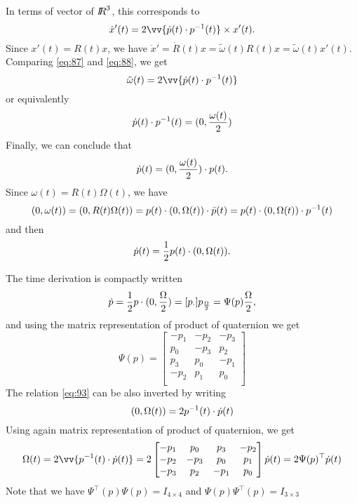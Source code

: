 In terms of vector of $\mbox{\rm $I\!\!R$}^3$, this corresponds to
\begin{equation}
  \label{eq:88}
  \dot x'(t) = 2 \vv{ \dot p(t) \glaw p^{-1}(t) } \times x'(t).
\end{equation}
Since $x'(t) = R(t) x$, we have $\dot x' = \dot R(t) x = \tilde \omega(t) R(t) x  = \tilde \omega(t) x'(t) $. Comparing \eqref{eq:87} and \eqref{eq:88}, we get
\begin{equation}
  \label{eq:89}
  \tilde \omega(t)  = 2 \vv{ \dot p(t) \glaw p^{-1}(t) } 
\end{equation}
or equivalently
\begin{equation}
  \dot p(t) \cdot p^{-1}(t) = (0, \frac{\omega(t)}{2} )
  \label{eq:90}
\end{equation}
Finally, we can conclude that
\begin{equation}
  \label{eq:91}
  \dot p(t) = (0, \frac{\omega(t)}2 ) \cdot p(t).
\end{equation}
Since $\omega(t)=R(t)\Omega(t)$, we have
\begin{equation}
  \label{eq:92}
  (0, \omega(t) ) = (0, R(t) \Omega(t) ) = p(t) \cdot (0, \Omega(t) ) \cdot \bar p(t) = p(t) \cdot (0, \Omega(t) ) \cdot  p^{-1}(t)
\end{equation}
and then
\begin{equation}
  \label{eq:93}
  \dot p(t) =\frac 1 2 p(t) \cdot(0, \Omega(t) ) .
\end{equation}

The time derivation is compactly written
\begin{equation}
  \label{eq:94}
  \dot p = \frac  1 2 p  \cdot(0, \frac\Omega 2 ) =  [p_\cdot] p_{\frac \Omega 2} = \Psi(p)\frac \Omega 2,
\end{equation}
and using the matrix representation of product of  quaternion
we get
\begin{equation}
  \label{eq:95}
  \Psi(p) =  \begin{bmatrix}
    -p_1 & -p_2 & -p_3 \\
    p_0 & -p_3 & p_2 \\
    p_3 & p_0 & -p_1 \\
    -p_2 & p_1 & p_0 \\
  \end{bmatrix}
\end{equation}
The relation \eqref{eq:93} can be also inverted by writing
\begin{equation}
  \label{eq:96}
   (0, \Omega(t) ) = 2 p^{-1}(t) \cdot \dot p(t)
\end{equation}
Using again  matrix representation of product of  quaternion, we get 
\begin{equation}
  \label{eq:97}
  \Omega(t)  = 2 \vv{p^{-1}(t) \glaw \dot p(t)}  = 2  \begin{bmatrix}
    -p_1 & p_0 & p_3 & -p_2 \\
    -p_2 & -p_3 & p_0 & p_1 \\
    -p_3 & p_2 & -p_1  & p_0\\
  \end{bmatrix}\dot p(t) = 2 \Psi(p)^\top \dot p(t)
\end{equation}
Note that we have $\Psi^\top(p)\Psi(p)= I_{4\times 4 }$ and  $\Psi(p)\Psi^\top(p)= I_{3\times 3 }$

